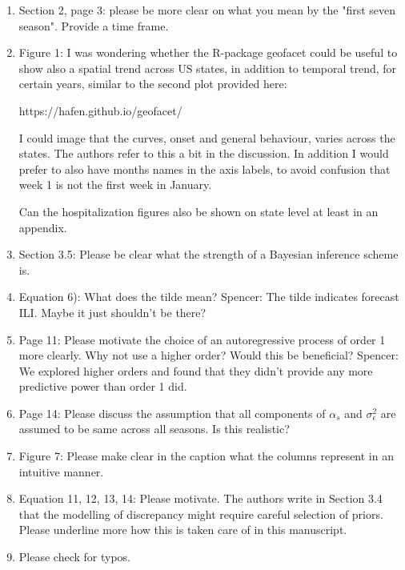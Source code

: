 \documentclass{article}
\newcommand{\spencer}[1]{{\color{green} Spencer: #1}}
\begin{document}
\begin{enumerate}[-]

\item Section 2, page 3: please be more clear on what you mean by the 
"first seven season". Provide a time frame.

\item Figure 1: I was wondering whether the R-package geofacet could be useful to 
show also a spatial trend across US states, in addition to temporal trend, for 
certain years,  similar to the second plot provided here:

https://hafen.github.io/geofacet/

I could image that the curves, onset and general behaviour, varies across the 
states. The authors refer to this a bit in the discussion. In addition I would 
prefer to also have months names in the axis labels, to avoid confusion that 
week 1 is not the first week in January.

Can the hospitalization figures also be shown on state level at least in an appendix.

\item Section 3.5: Please be clear what the strength of a Bayesian inference scheme is. 

\item Equation 6): What does the tilde mean?
\spencer{The tilde indicates forecast ILI. Maybe it just shouldn't be there?}

\item Page 11: Please motivate the choice of an autoregressive process of order 1 
more clearly. Why not use a higher order? Would this be beneficial?
\spencer{We explored higher orders and found that they didn't provide any more
predictive power than order 1 did.}

\item Page 14: Please discuss the assumption that all components of $\alpha_s$ and 
$\sigma_\epsilon^2$ are assumed to be same across all seasons. Is this realistic?

\item Figure 7: Please make clear in the caption what the columns represent in an 
intuitive manner. 

\item Equation 11, 12, 13, 14: Please motivate. The authors write in Section 3.4 
that the modelling of discrepancy might require careful selection of priors. 
Please underline more how this is taken care of in this manuscript.

\item Please check for typos.
  
\end{enumerate}
\end{document}
